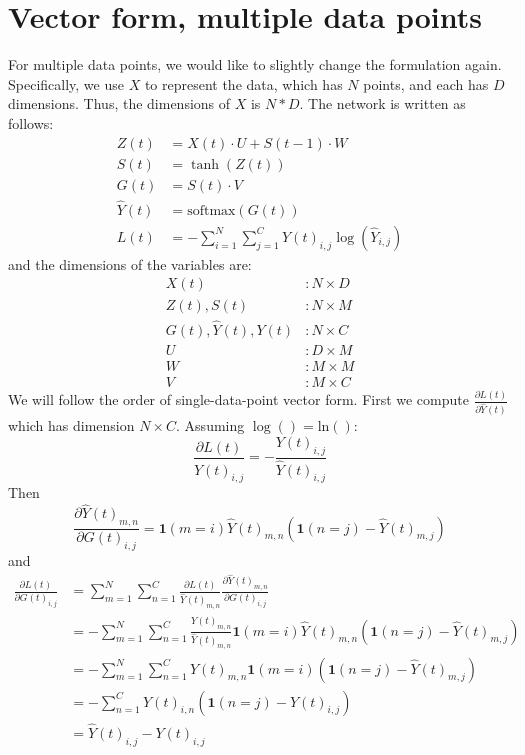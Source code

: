 \documentclass{article}
\begin{document}
\section{Vector form, multiple data points}
For multiple data points, we would like to slightly change the formulation again. Specifically, we use $X$ to represent the data, which has $N$ points, and each has $D$ dimensions. Thus, the dimensions of $X$ is $N * D$. The network is written as follows:
\begin{align}
    Z(t) &= X(t)\cdot U + S(t-1)\cdot W \\
    S(t) &= \tanh(Z(t)) \\
    G(t) &= S(t)\cdot V \\
    \hat{Y}(t) &= \text{softmax}(G(t)) \\
    L(t) &= -\sum_{i=1}^N\sum_{j=1}^CY(t)_{i, j}\log(\hat{Y}_{i, j})
\end{align}
and the dimensions of the variables are:
\begin{align}
    X(t) &: N \times D \\
    Z(t), S(t) &: N \times M \\
    G(t), \hat{Y}(t), Y(t) &: N \times C \\
    U &: D \times M \\
    W &: M \times M \\
    V &: M \times C
\end{align}
We will follow the order of single-data-point vector form. First we compute $\frac{\partial L(t)}{\partial \hat{Y}(t)}$ which has dimension $N \times C$. Assuming $\log() = \text{ln}()$:
\begin{equation}
    \frac{\partial L(t)}{\hat{Y}(t)_{i, j}} = -\frac{Y(t)_{i, j}}{\hat{Y}(t)_{i, j}}
\end{equation}
Then
\begin{equation}
    \frac{\partial \hat{Y}(t)_{m, n}}{\partial G(t)_{i, j}} = \mathbf{1}(m = i)\hat{Y}(t)_{m, n}(\mathbf{1}(n=j) - \hat{Y}(t)_{m, j}) 
\end{equation}
and
\begin{align}
    \frac{\partial L(t)}{\partial G(t)_{i, j}} 
    &= \sum_{m=1}^N\sum_{n=1}^C\frac{\partial L(t)}{\hat{Y}(t)_{m, n}}\frac{\partial \hat{Y}(t)_{m, n}}{\partial G(t)_{i, j}} \\
    &= -\sum_{m=1}^N\sum_{n=1}^C\frac{Y(t)_{m, n}}{\hat{Y}(t)_{m, n}}\mathbf{1}(m = i)\hat{Y}(t)_{m, n}(\mathbf{1}(n=j) - \hat{Y}(t)_{m, j}) \\
    &= -\sum_{m=1}^N\sum_{n=1}^CY(t)_{m, n}\mathbf{1}(m = i)(\mathbf{1}(n=j) - \hat{Y}(t)_{m, j}) \\
    &= -\sum_{n=1}^CY(t)_{i, n}(\mathbf{1}(n=j) - \hat{Y}(t)_{i, j}) \\
    &= \hat{Y}(t)_{i, j} - Y(t)_{i, j}
\end{align}
\end{document}
